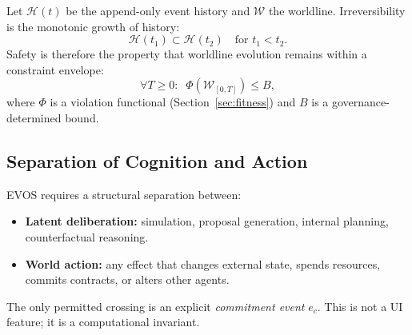 \documentclass[11pt]{article}
\begin{document}
Let $\mathcal{H}(t)$ be the append-only event history and $\mathcal{W}$ the worldline.
Irreversibility is the monotonic growth of history:
\[
\mathcal{H}(t_1) \subset \mathcal{H}(t_2)\quad\text{for } t_1 < t_2.
\]
Safety is therefore the property that worldline evolution remains within a constraint envelope:
\[
\forall T\ge 0:\;\;\Phi(\mathcal{W}_{[0,T]}) \le B,
\]
where $\Phi$ is a violation functional (Section~\ref{sec:fitness}) and $B$ is a governance-determined bound.

\subsection{Separation of Cognition and Action}
\label{sec:sep-cognition-action}

EVOS requires a structural separation between:
\begin{itemize}
  \item \textbf{Latent deliberation:} simulation, proposal generation, internal planning, counterfactual reasoning.
  \item \textbf{World action:} any effect that changes external state, spends resources, commits contracts, or alters other agents.
\end{itemize}

The only permitted crossing is an explicit \emph{commitment event} $e_c$.
This is not a UI feature; it is a computational invariant.
\end{document}
